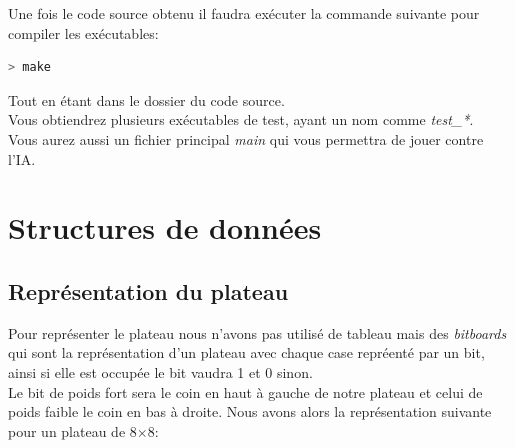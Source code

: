\documentclass{article}
\begin{document}
Une fois le code source obtenu il faudra exécuter la commande suivante pour compiler les exécutables:
\begin{lstlisting}[language=bash]
	> make
\end{lstlisting}

Tout en étant dans le dossier du code source.\\

Vous obtiendrez plusieurs exécutables de test, ayant un nom comme \textit{test\_*}.\\
Vous aurez aussi un fichier principal \textit{main} qui vous permettra de jouer contre l'IA.

\pagebreak
\section{Structures de données}
\subsection{Représentation du plateau}

Pour représenter le plateau nous n'avons pas utilisé de tableau mais des \textit{bitboards} qui
sont la représentation d'un plateau avec chaque case repréenté par un bit, ainsi si elle est
occupée le bit vaudra 1 et 0 sinon.\\
Le bit de poids fort sera le coin en haut à gauche de notre plateau et celui de poids faible le coin 
en bas à droite. Nous avons alors la représentation suivante pour un plateau de 8$\times$8:
\end{document}
